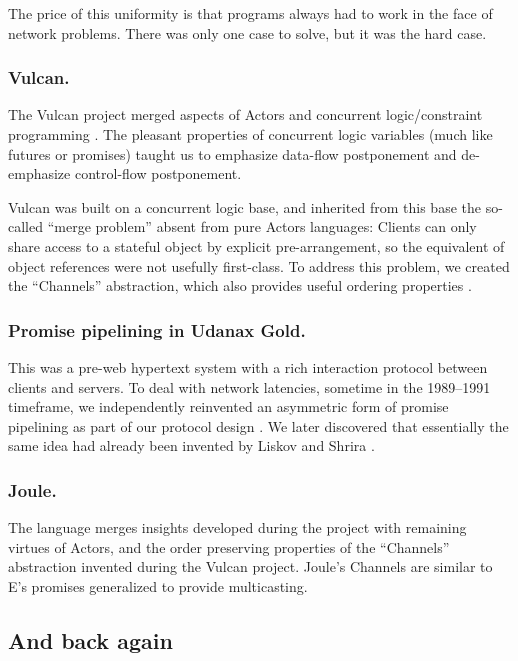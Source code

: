 \documentclass{llncs}
\begin{document}
The price of this uniformity is that programs always had to work in
the face of network problems. There was only one case to solve, but it
was the hard case.

\subsubsection{Vulcan.} The Vulcan project \cite{kahn:vulcan}
merged aspects of Actors and concurrent logic/constraint programming
\cite{tr003,Saraswat93,janus}. The pleasant properties of concurrent
logic variables (much like futures or promises) taught us to emphasize
data-flow postponement and de-emphasize control-flow
postponement. 

Vulcan was built on a concurrent logic base, and inherited from this
base the so-called ``merge problem'' \cite{Shapiro:merge} absent from
pure Actors languages: Clients can only share access to a stateful
object by explicit pre-arrangement, so the equivalent of object
references were not usefully first-class. To address this problem, we
created the ``Channels'' abstraction, which also provides useful
ordering properties \cite{tribble:channels}.

\subsubsection{Promise pipelining in Udanax Gold.} This was a
pre-web hypertext system with a rich interaction protocol between
clients and servers. To deal with network latencies, sometime in the
1989--1991 timeframe, we independently reinvented an asymmetric form
of promise pipelining as part of our protocol design
\cite{gold:promises}. We later discovered that essentially the same
idea had already been invented by Liskov and Shrira
\cite{liskov:promises}.

\subsubsection{Joule.} The  language \cite{tribble:joule}
merges insights developed during the  project with
remaining virtues of Actors, and the order preserving properties of
the ``Channels'' abstraction invented during the Vulcan
project. Joule's Channels are similar to E's promises generalized to
provide multicasting. 

\subsection{And back again}
\end{document}
